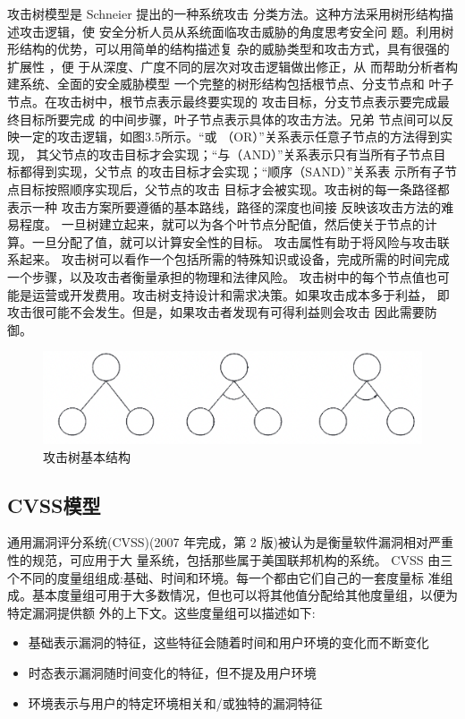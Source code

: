 攻击树模型是 Schneier\cite{schneier1999attack} 提出的一种系统攻击
分类方法。这种方法采用树形结构描述攻击逻辑，使
安全分析人员从系统面临攻击威胁的角度思考安全问
题。利用树形结构的优势，可以用简单的结构描述复
杂的威胁类型和攻击方式，具有很强的扩展性 \cite{tuozhan}
，便
于从深度、广度不同的层次对攻击逻辑做出修正，从
而帮助分析者构建系统、全面的安全威胁模型
一个完整的树形结构包括根节点、分支节点和
叶子节点。在攻击树中，根节点表示最终要实现的
攻击目标，分支节点表示要完成最终目标所要完成
的中间步骤，叶子节点表示具体的攻击方法。兄弟
节点间可以反映一定的攻击逻辑，如图3.5所示。“或
（OR）”关系表示任意子节点的方法得到实现，
其父节点的攻击目标才会实现；“与（AND）”关系表示只有当所有子节点目标都得到实现，父节点
的攻击目标才会实现；“顺序（SAND）”关系表
示所有子节点目标按照顺序实现后，父节点的攻击
目标才会被实现。攻击树的每一条路径都表示一种
攻击方案所要遵循的基本路线，路径的深度也间接
反映该攻击方法的难易程度。
一旦树建立起来，就可以为各个叶节点分配值，然后使关于节点的计算。一旦分配了值，就可以计算安全性的目标。
攻击属性有助于将风险与攻击联系起来。
攻击树可以看作一个包括所需的特殊知识或设备，完成所需的时间完成一个步骤，以及攻击者衡量承担的物理和法律风险。
攻击树中的每个节点值也可能是运营或开发费用。攻击树支持设计和需求决策。如果攻击成本多于利益，
即攻击很可能不会发生。但是，如果攻击者发现有可得利益则会攻击 因此需要防御。

\begin{figure}
    \centering
    \includegraphics[scale=0.6]{resources/img/i8.png}
    \caption{攻击树基本结构}
  \end{figure}

\subsection{CVSS模型}

通用漏洞评分系统(CVSS)(2007 年完成，第 2 版)被认为是衡量软件漏洞相对严重性的规范，可应用于大
量系统，包括那些属于美国联邦机构的系统\cite{mell2007common}。
CVSS 由三个不同的度量组组成:基础、时间和环境。每一个都由它们自己的一套度量标
准组成。基本度量组可用于大多数情况，但也可以将其他值分配给其他度量组，以便为特定漏洞提供额
外的上下文。这些度量组可以描述如下:
\begin{itemize}
    \item  基础表示漏洞的特征，这些特征会随着时间和用户环境的变化而不断变化
    \item  时态表示漏洞随时间变化的特征，但不提及用户环境
    \item  环境表示与用户的特定环境相关和/或独特的漏洞特征
\end{itemize}

